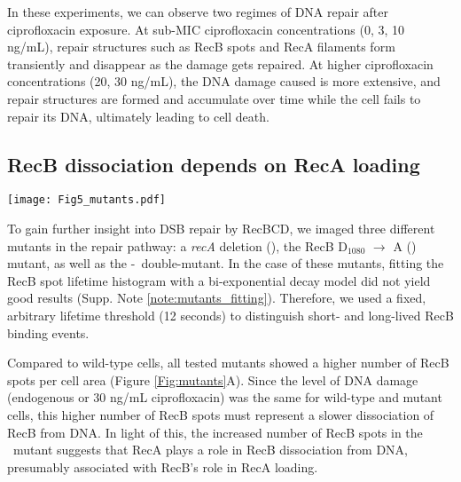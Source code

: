In these experiments, we can observe two regimes of DNA repair after ciprofloxacin exposure. At sub-MIC ciprofloxacin concentrations (0, 3, 10 ng/mL), repair structures such as RecB spots and RecA filaments form transiently and disappear as the damage gets repaired. At higher ciprofloxacin concentrations (20, 30 ng/mL), the DNA damage caused is more extensive, and repair structures are formed and accumulate over time while the cell fails to repair its DNA, ultimately leading to cell death.


\subsection*{RecB dissociation depends on RecA loading}

\begin{figure*}[htbp]
\begin{center}
\texttt{[image: Fig5\_mutants.pdf]}
\end{center}
\caption{}
\label{Fig:mutants}
\end{figure*}

To gain further insight into DSB repair by RecBCD, we imaged three different mutants in the repair pathway: a \textit{recA} deletion (\dreca), the RecB D$_{1080}$ $\rightarrow$ A (\teneighty) mutant, as well as the \dreca-\teneighty\ double-mutant. In the case of these mutants, fitting the RecB spot lifetime histogram with a bi-exponential decay model did not yield good results (Supp. Note \ref{note:mutants_fitting}). Therefore, we used a fixed, arbitrary lifetime threshold (12 seconds) to distinguish short- and long-lived RecB binding events.

Compared to wild-type cells, all tested mutants showed a higher number of RecB spots per cell area (Figure \ref{Fig:mutants}A). Since the level of DNA damage (endogenous or 30 ng/mL ciprofloxacin) was the same for wild-type and mutant cells, this higher number of RecB spots must represent a slower dissociation of RecB from DNA. In light of this, the increased number of RecB spots in the \dreca\ mutant suggests that RecA plays a role in RecB dissociation from DNA, presumably associated with RecB's role in RecA loading.


